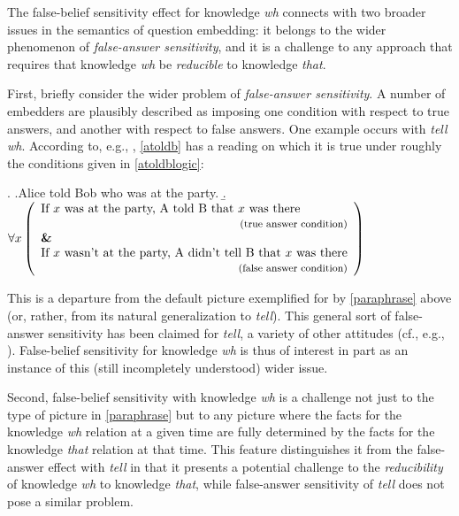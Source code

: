 \documentclass[a4paper]{article}
\begin{document}
The false-belief sensitivity effect for knowledge \textit{wh} connects with two broader issues in the semantics of question embedding: it belongs to the wider phenomenon of \emph{false-answer sensitivity}, and it is a challenge to any approach that requires that knowledge \textit{wh} be \emph{reducible} to knowledge \textit{that}.

First, briefly consider the wider problem of \emph{false-answer sensitivity}. A number of embedders are plausibly described as imposing one condition with respect to true answers, and another with respect to false answers. One example occurs with \textit{tell wh}. According to, e.g., \citet{kr:11}, \ref{atoldb} has a reading on which it is true under roughly the conditions given in \ref{atoldblogic}:

\ex. \a.\label{atoldb}Alice told Bob who was at the party.
\b.\label{atoldblogic}$\forall x\left(\begin{array}{l}\textrm{If $x$ was at the party, A told B that $x$ was there}\\\multicolumn{1}{r}{\textrm{\footnotesize (true answer condition)}}\\\textbf{\&}\\\textrm{If $x$ wasn't at the party, A didn't tell B that $x$ was there}\\\multicolumn{1}{r}{\textrm{\footnotesize (false answer condition)}}\end{array}\right)$

This is a departure from the default picture exemplified for by \ref{paraphrase} above (or, rather, from its natural generalization to \textit{tell}). This general sort of false-answer sensitivity has been claimed for \textit{tell}, a variety of other attitudes (cf., e.g., \citet{berman,heim:94,kr:11,preuss}). False-belief sensitivity for knowledge \textit{wh} is thus of interest in part as an instance of this (still incompletely understood) wider issue.


Second, false-belief sensitivity with knowledge \textit{wh} is a challenge not just to the type of picture in \ref{paraphrase} but to any picture where the facts for the knowledge \textit{wh} relation at a given time are fully determined by the facts for the knowledge \textit{that} relation at that time. This feature distinguishes it from the false-answer effect with \textit{tell} in that it presents a potential challenge to the \emph{reducibility} of knowledge \textit{wh} to knowledge \textit{that}, while false-answer sensitivity of \textit{tell} does not pose a similar problem.
\end{document}
